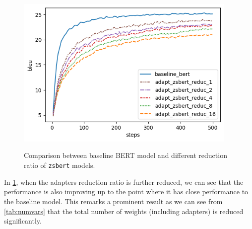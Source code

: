 \begin{figure}[]
    {\includegraphics[width=0.95\textwidth]{img/adapter_zsbert_ratio.png}}
    \centering
    \caption{Comparison between baseline BERT model and different reduction ratio of \texttt{zsbert} models.}
    \label{img:adapter_zsbert_ratio}
\end{figure}

In \cref{img:adapter_zsbert_ratio}, when the adapters reduction ratio is further reduced, we can see that the performance is also improving up to the point where it has close performance to the baseline model. This remarks a prominent result as we can see from \cref{tab:numvars} that the total number of weights (including adapters) is reduced significantly.

